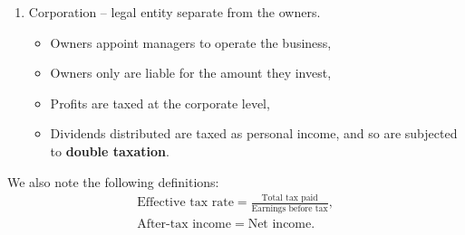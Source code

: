 \documentclass[../notes_compiled.tex]{subfiles}
\begin{document}
\begin{itemize}
\begin{enumerate}
\begin{itemize}
\item Profits are taxed as income.
\end{itemize}
\item Corporation -- legal entity separate from the owners.
\begin{itemize}
\item Owners appoint managers to operate the business,
\item Owners only are liable for the amount they invest,
\item Profits are taxed at the corporate level,
\item Dividends distributed are taxed as personal income, and so are subjected to \textbf{double taxation}.
\end{itemize}
\end{enumerate}
We also note the following definitions:
\begin{gather}
\text{Effective tax rate} = \frac{\text{Total tax paid}}{\text{Earnings before tax}}, \\
\text{After-tax income} = \text{Net income}.
\end{gather}
\end{itemize}
\end{document}
